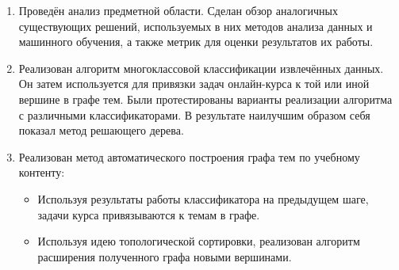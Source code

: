 \documentclass[14pt]{matmex-diploma-custom}
\begin{document}
\begin{enumerate}
    \item Проведён анализ предметной области. Сделан обзор аналогичных существующих решений, используемых в них методов анализа данных и машинного обучения, а также метрик для оценки результатов их работы. 
    \item Реализован алгоритм многоклассовой классификации извлечённых данных. Он затем используется для привязки задач онлайн-курса к той или иной вершине в графе тем. Были протестированы варианты реализации алгоритма с различными классификаторами. В результате наилучшим образом себя показал метод решающего дерева.
    \item Реализован метод автоматического построения графа тем по учебному контенту:
    \begin{itemize}
        \item Используя результаты работы классификатора на предыдущем шаге, задачи курса привязываются к темам в графе.
        \item Используя идею топологической сортировки, реализован алгоритм расширения полученного графа новыми вершинами.
    \end{itemize}
\end{enumerate}

\setmonofont[Mapping=tex-text]{CMU Typewriter Text}


\end{document}
